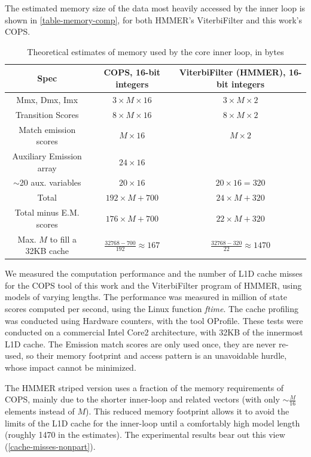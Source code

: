 The estimated memory size of the data most heavily accessed by the inner loop is shown in \autoref{table-memory-comp}, for both HMMER's ViterbiFilter and this work's COPS.


\begin{table}[htb!]
\centering
\caption[Estimates of used inner loop memory] {Theoretical estimates of memory used by the core inner loop, in bytes}
\label{table-memory-comp}

\begin{tabular}{|c|c|c|}
\hline
	Spec & COPS, 16-bit integers   &   ViterbiFilter (HMMER), 16-bit integers   \\ \hline
	Mmx, Dmx, Imx	&	$3 \times M \times 1 6$	& $3 \times M \times 2$	\\ \hline
	Transition Scores	&	$8 \times M \times 16 $	& $8 \times M \times 2$	\\ \hline
	Match emission scores &	$M  \times 16 $		& $M \times 2$		\\ \hline
	Auxiliary Emission array &	$24 \times 16 $		&  \textendash		\\ \hline
	$\sim$20 aux. variables	&	$20 \times 16 $		& $20 \times 16 = 320$	\\ \hline
	Total			&	$192 \times M +700$	& $24 \times M  + 320$	\\ \hline
	Total minus E.M. scores &	$176 \times M + 700$	& $22 \times M + 320$	\\ \hline
	Max. $M$ to fill a 32KB cache &	$\frac{32768-700}{192} \approx 167 $	&  $\frac{32768-320}{22} \approx 1470 $ \\ \hline
\end{tabular}
\end{table}

We measured the computation performance and the number of L1D cache misses for the COPS tool of this work and the ViterbiFilter program of HMMER, using models of varying lengths. The performance was measured in million of state scores computed per second, using the Linux function \emph{ftime}. The cache profiling was conducted using Hardware counters, with the tool OProfile. \cite{oprofile} These tests were conducted on a commercial Intel Core2 architecture, with 32KB of the innermost L1D cache. The Emission match scores are only used once, they are never re-used, so their memory footprint and access pattern is an unavoidable hurdle, whose impact cannot be minimized.


The HMMER striped version uses a fraction of the memory requirements of COPS, mainly due to the shorter inner-loop and related vectors (with only $\sim$$\frac{M}{16}$ elements instead of $M$). This reduced memory footprint allows it to avoid the limits of the L1D cache for the inner-loop until a comfortably high model length (roughly 1470 in the estimates). The experimental results bear out this view (\autoref{cache-misses-nonpart}).

